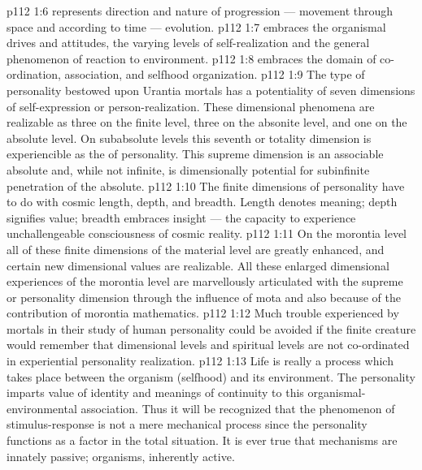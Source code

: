 \vs p112 1:6 \bibnobreakspace {} represents direction and nature of progression --- movement through space and according to time --- evolution.
\vs p112 1:7 \bibnobreakspace {} embraces the organismal drives and attitudes, the varying levels of self\hyp{}realization and the general phenomenon of reaction to environment.
\vs p112 1:8 \bibnobreakspace {} embraces the domain of co\hyp{}ordination, association, and selfhood organization.
\vs p112 1:9 \pc The type of personality bestowed upon Urantia mortals has a potentiality of seven dimensions of self\hyp{}expression or person\hyp{}realization. These dimensional phenomena are realizable as three on the finite level, three on the absonite level, and one on the absolute level. On subabsolute levels this seventh or totality dimension is experiencible as the  of personality. This supreme dimension is an associable absolute and, while not infinite, is dimensionally potential for subinfinite penetration of the absolute.
\vs p112 1:10 The finite dimensions of personality have to do with cosmic length, depth, and breadth. Length denotes meaning; depth signifies value; breadth embraces insight --- the capacity to experience unchallengeable consciousness of cosmic reality.
\vs p112 1:11 On the morontia level all of these finite dimensions of the material level are greatly enhanced, and certain new dimensional values are realizable. All these enlarged dimensional experiences of the morontia level are marvellously articulated with the supreme or personality dimension through the influence of mota and also because of the contribution of morontia mathematics.
\vs p112 1:12 Much trouble experienced by mortals in their study of human personality could be avoided if the finite creature would remember that dimensional levels and spiritual levels are not co\hyp{}ordinated in experiential personality realization.
\vs p112 1:13 \pc Life is really a process which takes place between the organism (selfhood) and its environment. The personality imparts value of identity and meanings of continuity to this organismal\hyp{}environmental association. Thus it will be recognized that the phenomenon of stimulus\hyp{}response is not a mere mechanical process since the personality functions as a factor in the total situation. It is ever true that mechanisms are innately passive; organisms, inherently active.
